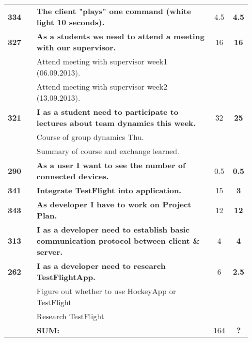 \begin{longtable}{ccXcc}
\textbf{334} 	& {F1}
	& {\bf The client "plays" one command (white light 10 seconds). } 	& 		4.5	& \textbf{4.5} \\

\textbf{327} 	&& {\bf As a students we need to attend a meeting with our supervisor. } 	& 		16	& \textbf{16} \\
				&& Attend meeting with supervisor week1 (06.09.2013).	&  &  \\
				&& Attend meeting with supervisor week2 (13.09.2013).	&  &  \\

\textbf{321} 	&& {\bf I as a student need to participate to lectures about team dynamics this week. } 	& 		32	& \textbf{25} \\
				&& Course of group dynamics Thu.	&  &  \\
				&& Summary of course and exchange learned.	&  &  \\
				
\textbf{290} 	& {F6}
	& {\bf As a user I want to see the number of connected devices. } 	& 		0.5	& \textbf{0.5} \\

\textbf{341} 	&& {\bf Integrate TestFlight into application. } 	& 		15	& \textbf{3} \\

\textbf{343} 	&& {\bf As developer I have to work on Project Plan.} 	& 		12	& \textbf{12} \\

\textbf{313} 	& {F1}
	& {\bf I as a developer need to establish basic communication protocol between client \& server.} 	& 		4	& \textbf{4} \\

\textbf{262} 	&& {\bf I as a developer need to research TestFlightApp. } 	& 		6	& \textbf{2.5} \\
				&& Figure out whether to use HockeyApp or TestFlight&  &  \\
				&& Research TestFlight	&  &  \\
				
\hline
				&& \textbf{SUM:}		&		164	& \textbf{?}
 \\																			
\bottomrule[1mm]
\end{longtable}

